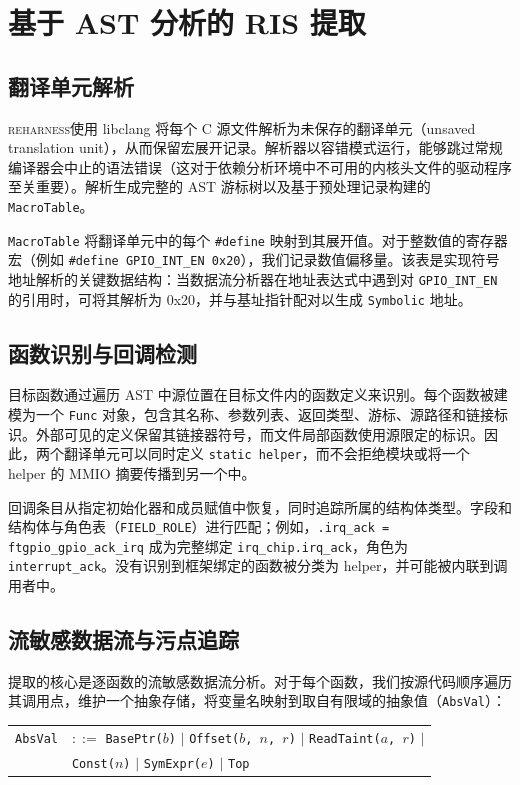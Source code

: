 \documentclass[sigplan, screen, review, anonymous]{acmart}
\newcommand{\reharness}{\textsc{reharness}}
\begin{document}
\section{基于 AST 分析的 RIS 提取}

\subsection{翻译单元解析}

\reharness 使用 libclang 将每个 C 源文件解析为未保存的翻译单元（unsaved translation unit），从而保留宏展开记录。解析器以容错模式运行，能够跳过常规编译器会中止的语法错误（这对于依赖分析环境中不可用的内核头文件的驱动程序至关重要）。解析生成完整的 AST 游标树以及基于预处理记录构建的 \texttt{MacroTable}。

\texttt{MacroTable} 将翻译单元中的每个 \texttt{\#define} 映射到其展开值。对于整数值的寄存器宏（例如 \texttt{\#define GPIO\_INT\_EN 0x20}），我们记录数值偏移量。该表是实现符号地址解析的关键数据结构：当数据流分析器在地址表达式中遇到对 \texttt{GPIO\_INT\_EN} 的引用时，可将其解析为 0x20，并与基址指针配对以生成 \texttt{Symbolic} 地址。

\subsection{函数识别与回调检测}

目标函数通过遍历 AST 中源位置在目标文件内的函数定义来识别。每个函数被建模为一个 \texttt{Func} 对象，包含其名称、参数列表、返回类型、游标、源路径和链接标识。外部可见的定义保留其链接器符号，而文件局部函数使用源限定的标识。因此，两个翻译单元可以同时定义 \texttt{static helper}，而不会拒绝模块或将一个 helper 的 MMIO 摘要传播到另一个中。

回调条目从指定初始化器和成员赋值中恢复，同时追踪所属的结构体类型。字段和结构体与角色表（\texttt{FIELD\_ROLE}）进行匹配；例如，\texttt{.irq\_ack = ftgpio\_gpio\_ack\_irq} 成为完整绑定 \texttt{irq\_chip.irq\_ack}，角色为 \texttt{interrupt\_ack}。没有识别到框架绑定的函数被分类为 helper，并可能被内联到调用者中。

\subsection{流敏感数据流与污点追踪}

提取的核心是逐函数的流敏感数据流分析。对于每个函数，我们按源代码顺序遍历其调用点，维护一个抽象存储，将变量名映射到取自有限域的抽象值（\texttt{AbsVal}）：

\begin{center}
\begin{tabular}{ll}
\texttt{AbsVal} & $::=$ \texttt{BasePtr($b$)} $|$ \texttt{Offset($b$, $n$, $r$)} $|$
\texttt{ReadTaint($a$, $r$)} $|$ \\
& \quad\;\; \texttt{Const($n$)} $|$ \texttt{SymExpr($e$)} $|$ \texttt{Top} \\
\end{tabular}
\end{center}
\end{document}
